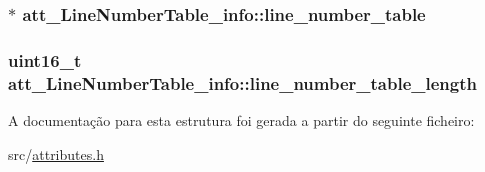 \subsubsection[{\texorpdfstring{line\+\_\+number\+\_\+table}{line_number_table}}]{$\ast$ att\+\_\+\+Line\+Number\+Table\+\_\+info\+::line\+\_\+number\+\_\+table}\hypertarget{structatt__LineNumberTable__info_ac9c52cc4b931ea8cfc746ea0a1d573ac}{}\label{structatt__LineNumberTable__info_ac9c52cc4b931ea8cfc746ea0a1d573ac}
\subsubsection[{\texorpdfstring{line\+\_\+number\+\_\+table\+\_\+length}{line_number_table_length}}]{\setlength{\rightskip}{0pt plus 5cm}uint16\+\_\+t att\+\_\+\+Line\+Number\+Table\+\_\+info\+::line\+\_\+number\+\_\+table\+\_\+length}\hypertarget{structatt__LineNumberTable__info_a6c335e2b6b14577d9a0e063cd5a361e0}{}\label{structatt__LineNumberTable__info_a6c335e2b6b14577d9a0e063cd5a361e0}


A documentação para esta estrutura foi gerada a partir do seguinte ficheiro\+:\begin{DoxyCompactItemize}
\item 
src/\hyperlink{attributes_8h}{attributes.\+h}\end{DoxyCompactItemize}
